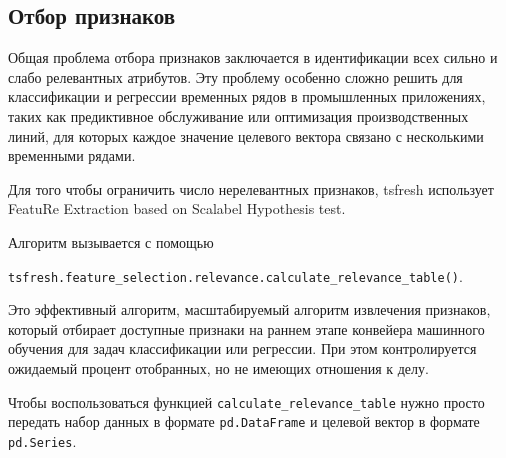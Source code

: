 \documentclass[%
	11pt,
	a4paper,
	utf8,
		]{article}
\begin{document}
\subsection{Отбор признаков}

Общая проблема отбора признаков заключается в идентификации всех сильно и слабо релевантных атрибутов. Эту проблему особенно сложно решить для классификации и регрессии временных рядов в промышленных приложениях, таких как предиктивное обслуживание или оптимизация производственных линий, для которых каждое значение целевого вектора связано с несколькими временными рядами.

Для того чтобы ограничить число нерелевантных признаков, tsfresh использует FeatuRe Extraction based on Scalabel Hypothesis test.

Алгоритм вызывается с помощью

\texttt{tsfresh.feature\_selection.relevance.calculate\_relevance\_table()}.

Это эффективный алгоритм, масштабируемый алгоритм извлечения признаков, который отбирает доступные признаки на раннем этапе конвейера машинного обучения для задач классификации или регрессии. При этом контролируется ожидаемый процент отобранных, но не имеющих отношения к делу.

Чтобы воспользоваться функцией \texttt{calculate\_relevance\_table} нужно просто передать набор данных в формате \texttt{pd.DataFrame} и целевой вектор в формате \texttt{pd.Series}.
\end{document}
